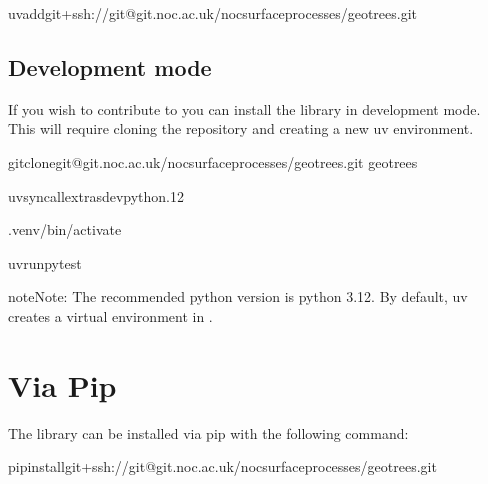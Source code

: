 \documentclass[letterpaper,10pt,english]{sphinxmanual}
\begin{document}
\begin{sphinxVerbatim}[commandchars=\\\{\}]
uvaddgit+ssh://git@git.noc.ac.uk/nocsurfaceprocesses/geotrees.git
\end{sphinxVerbatim}


\subsection{Development mode}
\label{\detokenize{installation:development-mode}}
\sphinxAtStartPar
If you wish to contribute to  you can install the library in development mode. This will require
cloning the repository and creating a new uv environment.

\begin{sphinxVerbatim}[commandchars=\\\{\}]
gitclonegit@git.noc.ac.uk/nocsurfaceprocesses/geotrees.git
geotrees

uvsync\PYGZhy{}\PYGZhy{}all\PYGZhy{}extras\PYGZhy{}\PYGZhy{}dev\PYGZhy{}\PYGZhy{}python.12

.venv/bin/activate

uvrunpytest
\end{sphinxVerbatim}

\begin{sphinxadmonition}{note}{Note:}
\sphinxAtStartPar
The recommended python version is python 3.12. By default, uv creates a virtual environment in .
\end{sphinxadmonition}


\section{Via Pip}
\label{\detokenize{installation:via-pip}}
\sphinxAtStartPar
The library can be installed via pip with the following command:

\begin{sphinxVerbatim}[commandchars=\\\{\}]
pipinstallgit+ssh://git@git.noc.ac.uk/nocsurfaceprocesses/geotrees.git
\end{sphinxVerbatim}
\end{document}
